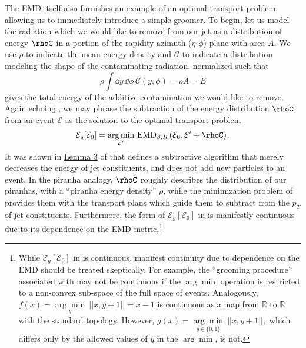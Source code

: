 \documentclass[letterpaper,11pt]{article}
\begin{document}
The EMD itself also furnishes an example of an optimal transport problem, allowing us to immediately introduce a simple \PIRANHA{} groomer.
%
To begin, let us model the radiation which we would like to remove from our jet as a distribution of energy \(\rhoC\) in a portion of the rapidity-azimuth (\(\eta\)-\(\phi\)) plane with area \(A\).
%
We use \(\rho\) to indicate the mean energy density and \(\mathcal{C}\) to indicate a distribution modeling the shape of the contaminating radiation, normalized such that
\begin{equation}
    \rho\int \dd y\,\dd\phi\,\mathcal{C}(y,\phi) = \rho A = E
\end{equation}
gives the total energy of the additive contamination we would like to remove.
%
Again echoing , we may phrase the subtraction of the energy distribution \(\rhoC\) from an event \(\mathcal{E}\) as the solution to the optimal transport problem
\begin{align}
    \mathcal{E}_g[\mathcal E_0] = \underset{\mathcal{E}'}{\arg \min}\ {\rm EMD}_{\beta, R}
    \left(\mathcal{E}_0, \mathcal{E}' + \rhoC\right)
    \label{eqn:simple_piranha}
    .
\end{align}
%
It was shown in \href{https://arxiv.org/pdf/2004.04159.pdf#page=33\&zoom=100,0,0}{Lemma 3} of  that  defines a subtractive algorithm that merely decreases the energy of jet constituents, and does not add new particles to an event.
%
In the piranha analogy, \(\rhoC\) roughly describes the distribution of our piranhas, with a ``piranha energy density'' \(\rho\), while the minimization problem of  provides them with the transport plans which guide them to subtract from the \(p_T\) of jet constituents.
%
Furthermore, the form of \(\mathcal{E}_g[\mathcal E_0]\) in  is manifestly continuous due to its dependence on the EMD metric.\footnote{
While \(\mathcal{E}_g[\mathcal E_0]\) in  is continuous, manifest continuity due to dependence on the EMD should be treated skeptically.
%
For example, the ``grooming procedure'' associated with   may not be continuous if the \(\arg \min\) operation is restricted to a non-convex sub-space of the full space of events.
%
Analogously, \(
    f(x)
    =
    \underset{y}{\arg \min}\ ||x, y+1||
    =
    x-1
\)
is continuous as a map from \(\mathbb R\) to \(\mathbb R\) with the standard topology.
%
However, \(
    g(x)
    =
    \underset{y \in \{0, 1\}}{\arg \min}\ ||x, y+1||,
\)
which differs only by the allowed values of \(y\) in the \(\arg \min\), is not.
}
\end{document}
